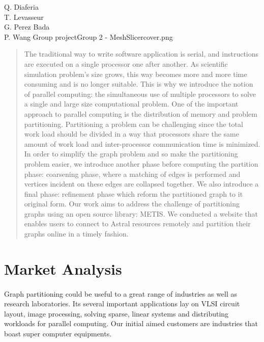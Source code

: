 \documentclass{cranfieldChart}
\begin{document}
{Q. Diaferia\\
T. Levasseur\\
G. Perez Bada\\
P. Wang
}{Group project}{Group 2 - MeshSlicer}{cover.png}

\newpage
\tableofcontents
\newpage

\begin{abstract}
The traditional way to write software application is serial, and instructions are executed on a single processor one after another.
As scientific simulation problem's size grows, this way becomes more and more time consuming and is no longer suitable. This is why we introduce the notion of parallel computing: the simultaneous use of multiple processors to solve a single and large size computational problem. One of the important approach to parallel computing is the distribution of memory and problem partitioning. Partitioning a problem can be challenging since the total work load should be divided in a way that processors share the same amount of work load and inter-processor communication time is minimized. In order to simplify the graph problem and so make the partitioning problem easier, we introduce another phase before computing the partition phase: coarsening phase, where a matching of edges is performed and vertices incident on these edges are collapsed together. We also introduce a final phase: refinement phase which reform the partitioned graph to it original form. Our work aims to address the challenge of partitioning graphs using an open source library: METIS. We conducted a website that enables users to connect to Astral resources remotely and partition their graphs online in a timely fashion. 
\end{abstract}

\newpage

\section{Market Analysis}
\paragraph{}
Graph partitioning could be useful to a great range of industries as well as research laboratories. Its several important applications lay on VLSI circuit layout, image processing, solving sparse, linear systems and distributing workloads for parallel computing. Our initial aimed customers are industries that boast super computer equipments.
\end{document}
